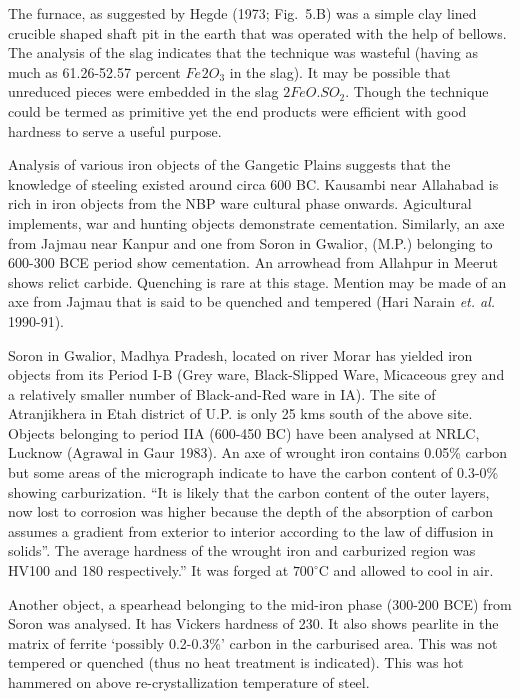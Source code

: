 The furnace, as suggested by Hegde (1973; Fig.~5.B) was a simple clay lined crucible shaped shaft pit in the earth that was operated with the help of bellows. The analysis of the slag indicates that the technique was wasteful (having as much as 61.26-52.57 percent $Fe_­­­­2O_3$ in the slag). It may be possible that unreduced pieces were embedded in the slag $2FeO. SO_2$. Though the technique could be termed as primitive yet the end products were efficient with good hardness to serve a useful purpose. 

Analysis of various iron objects of the Gangetic Plains suggests that the knowledge of steeling existed around circa 600 BC. Kausambi near Allahabad is rich in iron objects from the NBP ware cultural phase onwards. Agicultural implements, war and hunting objects demonstrate cementation. Similarly, an axe from Jajmau near Kanpur and one from Soron in Gwalior, (M.P.) belonging to 600-300 BCE period show cementation. An arrowhead from Allahpur in Meerut shows relict carbide. Quenching is rare at this stage. Mention may be made of an axe from Jajmau that is said to be quenched and tempered (Hari Narain {\it et. al.} 1990-91). 

Soron in Gwalior, Madhya Pradesh, located on river Morar has yielded iron objects from its Period I-B (Grey ware, Black-Slipped Ware, Micaceous grey and a relatively smaller number of Black-and-Red ware in IA). The site of Atranjikhera in Etah district of U.P. is only 25 kms south of the above site. Objects belonging to period IIA (600-450 BC) have been analysed at NRLC, Lucknow (Agrawal in Gaur 1983). An axe of wrought iron contains 0.05\% carbon but some areas of the micrograph indicate to have the carbon content of 0.3-0\% showing carburization. “It is likely that the carbon content of the outer layers, now lost to corrosion was higher because the depth of the absorption of carbon assumes a gradient from exterior to interior according to the law of diffusion in solids”. The average hardness of the wrought iron and carburized region was HV100 and 180 respectively.” It was forged at $700^\circ$C and allowed to cool in air. 


Another object, a spearhead belonging to the mid-iron phase (300-200 BCE) from Soron was analysed. It has Vickers hardness of 230. It also shows pearlite in the matrix of ferrite ‘possibly 0.2-0.3\%’ carbon in the carburised area. This was not tempered or quenched (thus no heat treatment is indicated). This was hot hammered on above re-crystallization temperature of steel. 

